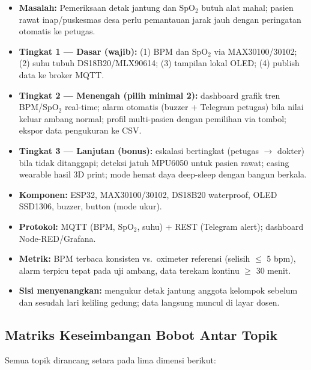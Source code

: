 \documentclass[11pt,a4paper]{article}
\begin{document}
\begin{itemize}
  \item \textbf{Masalah:} Pemeriksaan detak jantung dan SpO$_2$ butuh alat
        mahal; pasien rawat inap/puskesmas desa perlu pemantauan jarak jauh
        dengan peringatan otomatis ke petugas.
  \item \textbf{Tingkat 1 --- Dasar (wajib):} (1) BPM dan SpO$_2$ via
        MAX30100\slash 30102; (2) suhu tubuh DS18B20\slash MLX90614;
        (3) tampilan lokal OLED; (4) publish data ke broker MQTT.
  \item \textbf{Tingkat 2 --- Menengah (pilih minimal 2):} dashboard grafik
        tren BPM/SpO$_2$ real-time; alarm otomatis (buzzer + Telegram
        petugas) bila nilai keluar ambang normal; profil multi-pasien dengan
        pemilihan via tombol; ekspor data pengukuran ke CSV.
  \item \textbf{Tingkat 3 --- Lanjutan (bonus):} eskalasi bertingkat
        (petugas $\rightarrow$ dokter) bila tidak ditanggapi; deteksi jatuh
        MPU6050 untuk pasien rawat; casing wearable hasil 3D print;
        mode hemat daya deep-sleep dengan bangun berkala.
  \item \textbf{Komponen:} ESP32, MAX30100/30102, DS18B20 waterproof, OLED
        SSD1306, buzzer, button (mode ukur).
  \item \textbf{Protokol:} MQTT (BPM, SpO$_2$, suhu) + REST (Telegram alert);
        dashboard Node-RED/Grafana.
  \item \textbf{Metrik:} BPM terbaca konsisten vs.\ oximeter referensi
        (selisih $\leq$ 5 bpm), alarm terpicu tepat pada uji ambang,
        data terekam kontinu $\geq$ 30 menit.
  \item \textbf{Sisi menyenangkan:} mengukur detak jantung anggota kelompok
        sebelum dan sesudah lari keliling gedung; data langsung muncul di
        layar dosen.
\end{itemize}

\subsection*{Matriks Keseimbangan Bobot Antar Topik}\label{sec:balance}

Semua topik dirancang setara pada lima dimensi berikut:
\end{document}
